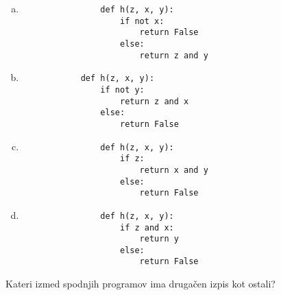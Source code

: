 \documentclass[arhiv, 10pt]{../izpit}
\begin{document}
        \begin{multicols}{2}
        \begin{enumerate}[(a)]
\item 
                \begin{verbatim}
                def h(z, x, y):
                    if not x:
                        return False
                    else:
                        return z and y
                \end{verbatim}
            
\item 
            \begin{verbatim}
            def h(z, x, y):
                if not y:
                    return z and x
                else:
                    return False
            \end{verbatim}
        
\item 
                \begin{verbatim}
                def h(z, x, y):
                    if z:
                        return x and y
                    else:
                        return False
                \end{verbatim}
            
\item 
                \begin{verbatim}
                def h(z, x, y):
                    if z and x:
                        return y
                    else:
                        return False
                \end{verbatim}
            
\end{enumerate}

        \end{multicols}
    
        \naloga*
        
        Kateri izmed spodnjih programov ima drugačen izpis kot ostali?
    
\end{document}
